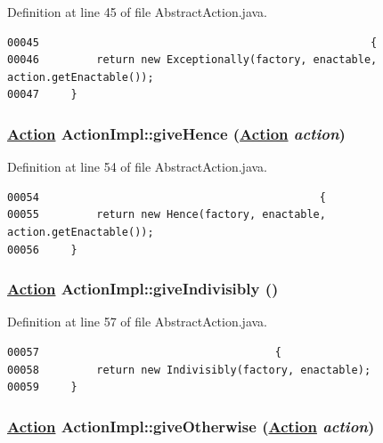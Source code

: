 Definition at line 45 of file Abstract\-Action.java.\footnotesize\begin{verbatim}00045                                                    {
00046         return new Exceptionally(factory, enactable, action.getEnactable());
00047     }
\end{verbatim}\normalsize 
\hypertarget{classActionImpl_a8}{
\subsubsection[giveHence]{\setlength{\rightskip}{0pt plus 5cm}\hyperlink{interfaceAction}{Action} Action\-Impl::give\-Hence (\hyperlink{interfaceAction}{Action} {\em action})}}
\label{classActionImpl_a8}




Definition at line 54 of file Abstract\-Action.java.\footnotesize\begin{verbatim}00054                                            {
00055         return new Hence(factory, enactable, action.getEnactable());
00056     }
\end{verbatim}\normalsize 
\hypertarget{classActionImpl_a9}{
\subsubsection[giveIndivisibly]{\setlength{\rightskip}{0pt plus 5cm}\hyperlink{interfaceAction}{Action} Action\-Impl::give\-Indivisibly ()}}
\label{classActionImpl_a9}




Definition at line 57 of file Abstract\-Action.java.\footnotesize\begin{verbatim}00057                                     {
00058         return new Indivisibly(factory, enactable);
00059     }
\end{verbatim}\normalsize 
\hypertarget{classActionImpl_a7}{
\subsubsection[giveOtherwise]{\setlength{\rightskip}{0pt plus 5cm}\hyperlink{interfaceAction}{Action} Action\-Impl::give\-Otherwise (\hyperlink{interfaceAction}{Action} {\em action})}}
\label{classActionImpl_a7}




